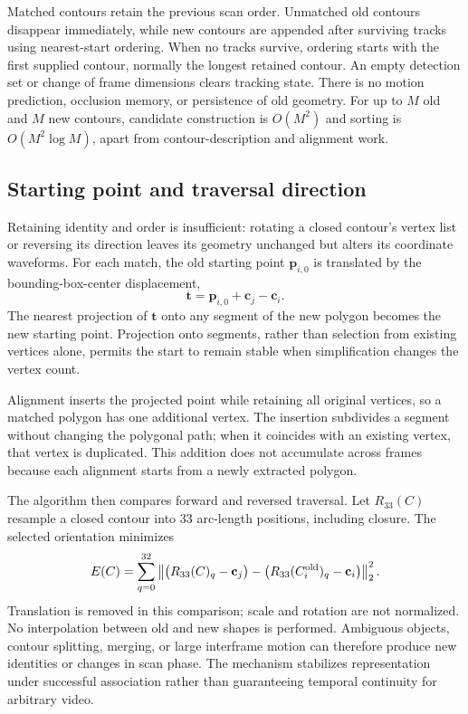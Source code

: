 \documentclass[11pt,a4paper]{article}
\begin{document}
Matched contours retain the previous scan order. Unmatched old contours disappear immediately, while new contours are appended after surviving tracks using nearest-start ordering. When no tracks survive, ordering starts with the first supplied contour, normally the longest retained contour. An empty detection set or change of frame dimensions clears tracking state. There is no motion prediction, occlusion memory, or persistence of old geometry. For up to $M$ old and $M$ new contours, candidate construction is $O(M^2)$ and sorting is $O(M^2\log M)$, apart from contour-description and alignment work.

\subsection{Starting point and traversal direction}
Retaining identity and order is insufficient: rotating a closed contour's vertex list or reversing its direction leaves its geometry unchanged but alters its coordinate waveforms. For each match, the old starting point $\mathbf p_{i,0}$ is translated by the bounding-box-center displacement,
\begin{equation}
 \mathbf t=\mathbf p_{i,0}+\mathbf c_j-\mathbf c_i.
\end{equation}
The nearest projection of $\mathbf t$ onto any segment of the new polygon becomes the new starting point. Projection onto segments, rather than selection from existing vertices alone, permits the start to remain stable when simplification changes the vertex count.

Alignment inserts the projected point while retaining all original vertices, so a matched polygon has one additional vertex. The insertion subdivides a segment without changing the polygonal path; when it coincides with an existing vertex, that vertex is duplicated. This addition does not accumulate across frames because each alignment starts from a newly extracted polygon.

The algorithm then compares forward and reversed traversal. Let $R_{33}(C)$ resample a closed contour into 33 arc-length positions, including closure. The selected orientation minimizes
\begin{equation}
 E(C)=\sum_{q=0}^{32}\left\|
 \bigl(R_{33}(C)_q-\mathbf c_j\bigr)
 -\bigl(R_{33}(C_i^{\rm old})_q-\mathbf c_i\bigr)
 \right\|_2^2.
 \label{eq:orientation}
\end{equation}
Translation is removed in this comparison; scale and rotation are not normalized. No interpolation between old and new shapes is performed. Ambiguous objects, contour splitting, merging, or large interframe motion can therefore produce new identities or changes in scan phase. The mechanism stabilizes representation under successful association rather than guaranteeing temporal continuity for arbitrary video.
\end{document}
